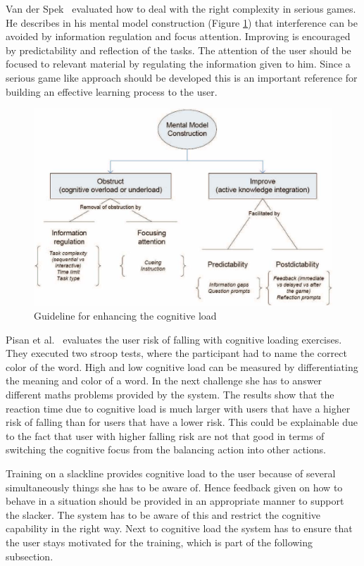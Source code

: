 Van der Spek~\cite{Van_der_Spek2010-fe} evaluated how to deal with the right complexity in serious games. He describes in his mental model construction (Figure \ref{fig:mentalModelConstruction}) that interference can be avoided by information regulation and focus attention. Improving is encouraged by predictability and reflection of the tasks. The attention of the user should be focused to relevant material by regulating the information given to him. Since a serious game like approach should be developed this is an important reference for building an effective learning process to the user.
\begin{figure}[htb]
	\centering
	\begin{minipage}[t]{1\linewidth}
		\centering
		\includegraphics[width=0.74\linewidth]{Pictures/mentalModelConstruction}
		\caption{Guideline for enhancing the cognitive load~\cite{Van_der_Spek2010-fe}}
		\label{fig:mentalModelConstruction}
	\end{minipage}
\end{figure}

Pisan et al.~\cite{Pisan2013-sf} evaluates the user risk of falling with cognitive loading exercises. They executed two stroop tests, where the participant had to name the correct color of the word. High and low cognitive load can be measured by differentiating the meaning and color of a word. In the next challenge she has to answer different maths problems provided by the system. The results show that the reaction time due to cognitive load is much larger with users that have a higher risk of falling than for users that have a lower risk. This could be explainable due to the fact that user with higher falling risk are not that good in terms of switching the cognitive focus from the balancing action into other actions. 

Training on a slackline provides cognitive load to the user because of several simultaneously things she has to be aware of. Hence feedback given on how to behave in a situation should be provided in an appropriate manner to support the slacker. The system has to be aware of this and restrict the cognitive capability in the right way. Next to cognitive load the system has to ensure that the user stays motivated for the training, which is part of the following subsection.

